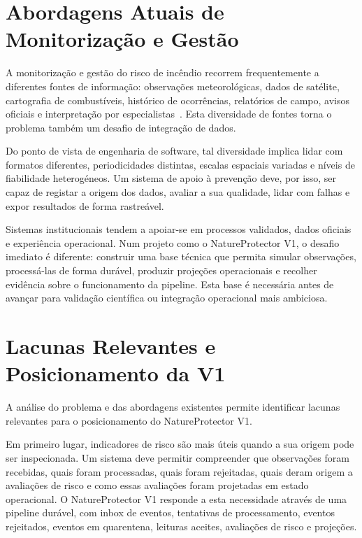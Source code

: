 \section{Abordagens Atuais de Monitorização e Gestão}

A monitorização e gestão do risco de incêndio recorrem frequentemente a diferentes fontes de informação: observações meteorológicas, dados de satélite, cartografia de combustíveis, histórico de ocorrências, relatórios de campo, avisos oficiais e interpretação por especialistas~\citep{copernicus_effis,ec_jrc_effis,nasa_firms,clms_corine_land_cover}. Esta diversidade de fontes torna o problema também um desafio de integração de dados.

Do ponto de vista de engenharia de software, tal diversidade implica lidar com formatos diferentes, periodicidades distintas, escalas espaciais variadas e níveis de fiabilidade heterogéneos. Um sistema de apoio à prevenção deve, por isso, ser capaz de registar a origem dos dados, avaliar a sua qualidade, lidar com falhas e expor resultados de forma rastreável.

Sistemas institucionais tendem a apoiar-se em processos validados, dados oficiais e experiência operacional. Num projeto como o NatureProtector V1, o desafio imediato é diferente: construir uma base técnica que permita simular observações, processá-las de forma durável, produzir projeções operacionais e recolher evidência sobre o funcionamento da pipeline. Esta base é necessária antes de avançar para validação científica ou integração operacional mais ambiciosa.

\section{Lacunas Relevantes e Posicionamento da V1}

A análise do problema e das abordagens existentes permite identificar lacunas relevantes para o posicionamento do NatureProtector V1.

Em primeiro lugar, indicadores de risco são mais úteis quando a sua origem pode ser inspecionada. Um sistema deve permitir compreender que observações foram recebidas, quais foram processadas, quais foram rejeitadas, quais deram origem a avaliações de risco e como essas avaliações foram projetadas em estado operacional. O NatureProtector V1 responde a esta necessidade através de uma pipeline durável, com inbox de eventos, tentativas de processamento, eventos rejeitados, eventos em quarentena, leituras aceites, avaliações de risco e projeções.


